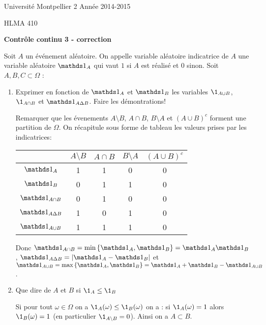 \documentclass[a4paper]{article}
\begin{document}
\noindent Université Montpellier 2 \hfill Année 2014-2015

\noindent HLMA 410
 


\bigskip

\begin{center}
{\large \sffamily\bfseries Contrôle continu 3 - correction}
\end{center}


\bigskip
\bigskip

Soit $A$ un événement aléatoire. On appelle variable aléatoire indicatrice de $A$ une variable aléatoire $\one_A$ qui vaut $1$ si $A$ est réalisé et $0$ sinon. Soit $A,B,C \subset \Omega$ :
\begin{enumerate}
	\item Exprimer en fonction de $\one_A$ et $\one_B$ les variables $\1_{A\cup B}$, $\1_{A \cap B}$ et $\one_{A\Delta B}$. Faire les démontrations!

		\medskip

		Remarquer que les évenements $A\setminus B$, $A\cap B$, $B \setminus A$ et $(A \cup B)^c$  forment une partition de $\Omega$. On récapitule sous forme de tableau les valeurs prises par les indicatrices:
		\begin{center}\begin{tabular}[]{|c|cccc|}
				\hline
				& $A\setminus B$ & $A\cap B$ & $B \setminus A$ & $(A \cup B)^c$  \\\hline 
				$\one_A$ & 1 & 1 & 0 & 0 \\
				$\one_B$ & 0 & 1 & 1 & 0 \\ \hline
				$\one_{A\cap B}$ & 0 & 1 & 0 & 0 \\
				$\one_{A \Delta B}$ & 1 & 0 & 1 & 0 \\
				$\one_{A \cup B}$ & 1 & 1 & 1 & 0 \\\hline
			\end{tabular}\end{center}
		Donc $\one_{A\cap B} = \min \left\{ \one_A,\one_B \right\} = \one_A \one_B$, $\one_{A \Delta B} = \abs{\one_A - \one_B}$ et $\one_{A\cup B} = \max\left\{ \one_A,\one_B \right\} = \one_A + \one_B - \one_{A\cup B}$.

		\medskip

	\item Que dire de $A$ et $B$ si $\1_A \leq \1_B$

		\medskip


		Si pour tout $\omega \in \Omega$ on a  $\1_A(\omega) \leq \1_B(\omega)$ on a : si $\1_{A}(\omega) = 1$ alors $\1_B(\omega) =1$ (en particulier $\1_{A \setminus B}=0$). Ainsi on a  $A \subset B$. 

		\medskip


\end{enumerate}
\end{document}
